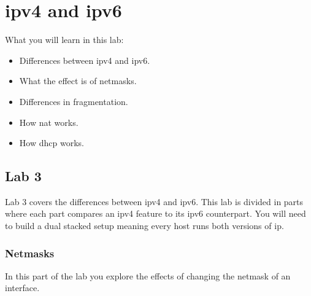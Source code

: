 
\setcounter{chapter}{2}
\chapter{\acs{ipv4} and \acs{ipv6}}

What you will learn in this lab:
\begin{itemize}
	\item Differences between \acs{ipv4} and \acs{ipv6}.
	\item What the effect is of netmasks.
	\item Differences in fragmentation.
	\item How \ac{nat} works.
	\item How \ac{dhcp} works.
\end{itemize}

\newpage
\section{Lab 3}\label{sec:lab3}
Lab 3 covers the differences between \acs{ipv4} and \acs{ipv6}. This lab is divided in parts where each part compares an \acs{ipv4} feature to its \acs{ipv6} counterpart. You will need to build a dual stacked setup meaning every host runs both versions of \acs{ip}.

\subsection{Netmasks}

In this part of the lab you explore the effects of changing the netmask of an interface.

